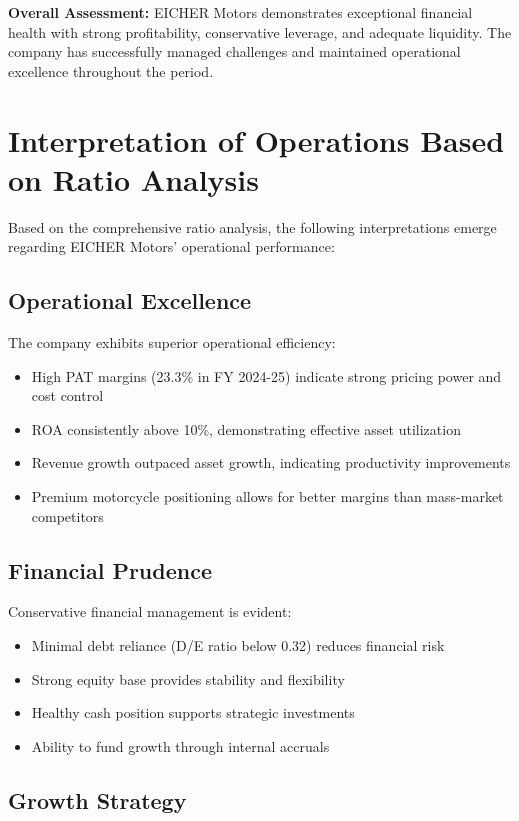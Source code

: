 \documentclass[8pt,a4paper]{article}
\begin{document}
\textbf{Overall Assessment:}
EICHER Motors demonstrates exceptional financial health with strong profitability, conservative leverage, and adequate liquidity. The company has successfully managed challenges and maintained operational excellence throughout the period.

\section{Interpretation of Operations Based on Ratio Analysis}

Based on the comprehensive ratio analysis, the following interpretations emerge regarding EICHER Motors' operational performance:

\subsection{Operational Excellence}

The company exhibits superior operational efficiency:
\begin{itemize}
    \item High PAT margins (23.3\% in FY 2024-25) indicate strong pricing power and cost control
    \item ROA consistently above 10\%, demonstrating effective asset utilization
    \item Revenue growth outpaced asset growth, indicating productivity improvements
    \item Premium motorcycle positioning allows for better margins than mass-market competitors
\end{itemize}

\subsection{Financial Prudence}

Conservative financial management is evident:
\begin{itemize}
    \item Minimal debt reliance (D/E ratio below 0.32) reduces financial risk
    \item Strong equity base provides stability and flexibility
    \item Healthy cash position supports strategic investments
    \item Ability to fund growth through internal accruals
\end{itemize}

\subsection{Growth Strategy}
\end{document}
